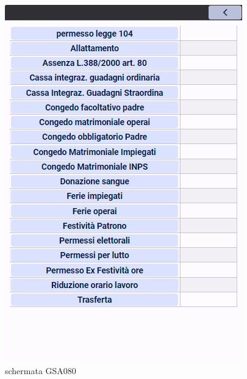 \documentclass[target=bach,aauheader=,style=]{thud}
\begin{document}
\begin{figure}[h]
    \centering
    \begin{minipage}{0.45\textwidth}
        \centering
        \includegraphics[width=\linewidth]{screenshot/Interfaccia_gsa082.png}
        \caption{schermata GSA080}
    \end{minipage}
    \hfill
    \begin{minipage}{0.45\textwidth}
        \centering

\end{minipage}
\end{figure}
\end{document}
